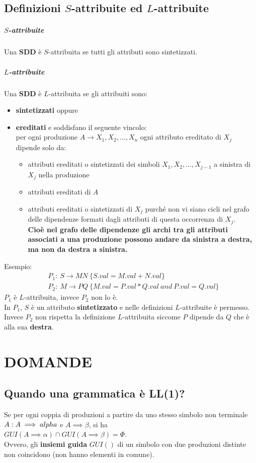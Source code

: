 \documentclass[12pt]{article}
\begin{document}
\subsection{Definizioni $S$-attribuite ed $L$-attribuite}
\subparagraph*{$S$-attribuite}
Una \textbf{SDD} è $S$-attribuita se tutti gli attributi sono sintetizzati.
\subparagraph*{$L$-attribuite}
Una \textbf{SDD} è $L$-attribuita se gli attribuiti sono:
\begin{itemize}
    \item \textbf{sintetizzati} oppure
    \item \textbf{ereditati} e soddisfano il seguente vincolo:\\
    per ogni produzione $A \rightarrow X_1, X_2, \dots, X_n$ ogni attributo ereditato di $X_j$ dipende solo da:
    \begin{itemize}
        \item attributi ereditati o sintetizzati dei simboli $X_1,X_2, \dots, X_{j-1}$ a sinistra di $X_j$ nella produzione
        \item attributi ereditati di $A$
        \item attributi ereditati o sintetizzati di $X_j$ purché non vi siano cicli nel grafo delle dipendenze formati dagli attributi di questa occorrenza di $X_j$.
        \\ \textbf{Cioè nel grafo delle dipendenze gli archi tra gli attributi associati a una produzione possono andare da sinistra a destra, ma non da destra a sinistra.}
    \end{itemize}
\end{itemize}
Esempio:
\begin{align*}
   &P_1:\ S \rightarrow MN\ \{S.val= M.val + N.val\}\\
   &P_2:\ M \rightarrow PQ\ \{M.val = P.val * Q.val\  and\ P.val =Q.val\} 
\end{align*}
$P_1$ è $L$-attribuita, invece $P_2$ non lo è.\\
In $P_1$, $S$ è un attributo \textbf{sintetizzato} e nelle definizioni 
$L$-attribuite è permesso.\\ 
Invece $P_2$ non rispetta la definizione $L$-attribuita  
siccome $P$ dipende da $Q$ che è alla sua \textbf{destra}.
\newpage


\section{DOMANDE}
\subsection{Quando una grammatica è LL(1)?}
Se per ogni coppia di produzioni a partire da uno stesso simbolo non terminale $A:\\
A\implies alpha$ e $A \implies \beta$, si ha\\
$GUI(A \implies \alpha) \cap GUI(A \implies \beta) = \Phi$.\\
Ovvero, gli \textbf{insiemi guida} $GUI()$ di un simbolo con due produzioni distinte non coincidono (non hanno elementi in comune).
\end{document}
